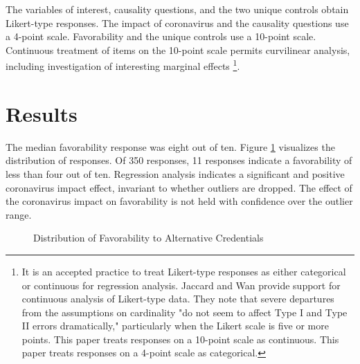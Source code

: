 \documentclass[review]{elsarticle}
\begin{document}
The variables of interest,
causality questions,
and the two unique controls obtain Likert-type responses.
The impact of coronavirus and the causality questions use a 4-point scale.
Favorability and the unique controls use a 10-point scale.
Continuous treatment of items on the 10-point scale permits curvilinear analysis,
including investigation of interesting marginal effects
\footnote{
    It is an accepted practice to treat Likert-type responses as either categorical or continuous for regression analysis.
    Jaccard and Wan provide support for continuous analysis of Likert-type data.
    They note that severe departures from the assumptions on cardinality "do not seem to affect Type I and Type II errors dramatically,"
    particularly when the Likert scale is five or more points\cite{jaccard1996lisrel}.
    This paper treats responses on a 10-point scale as continuous.
    This paper treats responses on a 4-point scale as categorical.
}.

\section{Results}

The median favorability response was eight out of ten.
Figure \ref{fig:one} visualizes the distribution of responses.
Of 350 responses, 11 responses indicate a favorability of less than four out of ten.
Regression analysis indicates a significant and positive coronavirus impact effect,
invariant to whether outliers are dropped.
The effect of the coronavirus impact on favorability
is not held with confidence over the outlier range.

\begin{figure}[h!]
    \centering
    \caption{Distribution of Favorability to Alternative Credentials}
    \label{fig:one}
\end{figure}
\end{document}
